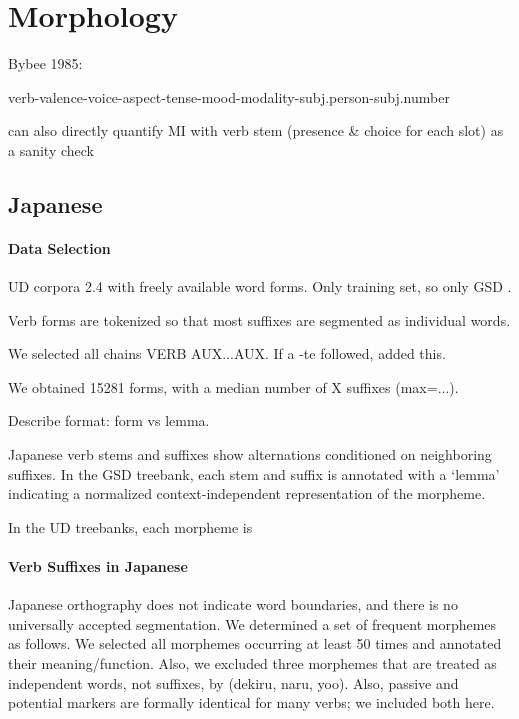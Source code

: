 \documentclass[11pt,letterpaper]{article}
\begin{document}
\section{Morphology}

Bybee 1985:

verb-valence-voice-aspect-tense-mood-modality-subj.person-subj.number

can also directly quantify MI with verb stem (presence \& choice for each slot) as a sanity check


\subsection{Japanese}


\paragraph{Data Selection}

UD corpora 2.4 with freely available word forms. Only training set, so only GSD \cite{tanaka2016universal, asahara2018universal}.

Verb forms are tokenized so that most suffixes are segmented as individual words.

We selected all chains VERB AUX...AUX. If a -te followed, added this.

We obtained 15281 forms, with a median number of X suffixes (max=...).

Describe format: form vs lemma.


Japanese verb stems and suffixes show alternations conditioned on neighboring suffixes.
In the GSD treebank, each stem and suffix is annotated with a `lemma' indicating a normalized context-independent representation of the morpheme.

In the UD treebanks, each morpheme is 


\paragraph{Verb Suffixes in Japanese}

Japanese orthography does not indicate word boundaries, and there is no universally accepted segmentation.
We determined a set of frequent morphemes as follows.
We selected all morphemes occurring at least 50 times and annotated their meaning/function.
Also, we excluded three morphemes that are treated as independent words, not suffixes, by \cite{kaiser2013japanese} (dekiru, naru, yoo).
Also, passive and potential markers are formally identical for many verbs; we included both here.
\end{document}
